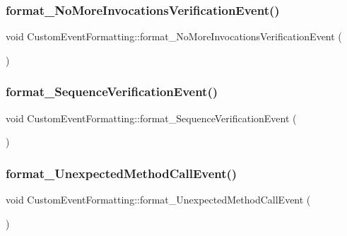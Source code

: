 \subsubsection{\texorpdfstring{format\_NoMoreInvocationsVerificationEvent()}{format\_NoMoreInvocationsVerificationEvent()}}
{\footnotesize\ttfamily void Custom\+Event\+Formatting\+::format\+\_\+\+No\+More\+Invocations\+Verification\+Event (\begin{DoxyParamCaption}{ }\end{DoxyParamCaption})\hspace{0.3cm}{\ttfamily [inline]}}

\mbox{\label{structCustomEventFormatting_ab675a3fa7d26ea7c289589024a0c641b}} 
\subsubsection{\texorpdfstring{format\_SequenceVerificationEvent()}{format\_SequenceVerificationEvent()}}
{\footnotesize\ttfamily void Custom\+Event\+Formatting\+::format\+\_\+\+Sequence\+Verification\+Event (\begin{DoxyParamCaption}{ }\end{DoxyParamCaption})\hspace{0.3cm}{\ttfamily [inline]}}

\mbox{\label{structCustomEventFormatting_a6e357b2a7cde44c4bf81950994c7c484}} 
\subsubsection{\texorpdfstring{format\_UnexpectedMethodCallEvent()}{format\_UnexpectedMethodCallEvent()}}
{\footnotesize\ttfamily void Custom\+Event\+Formatting\+::format\+\_\+\+Unexpected\+Method\+Call\+Event (\begin{DoxyParamCaption}{ }\end{DoxyParamCaption})\hspace{0.3cm}{\ttfamily [inline]}}

